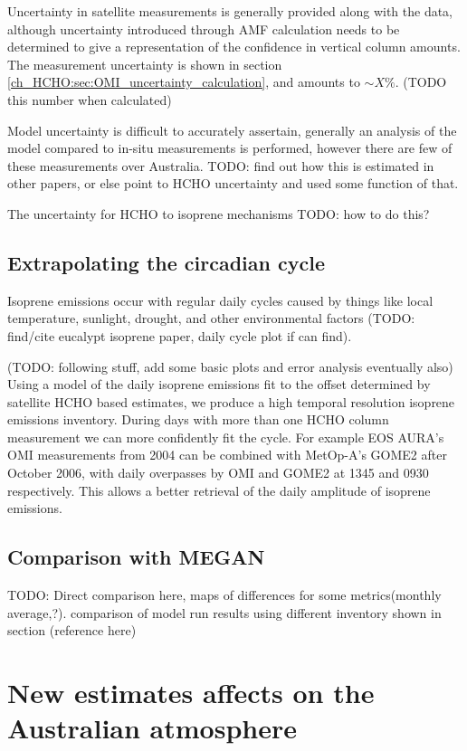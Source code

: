     Uncertainty in satellite measurements is generally provided along with the data, although uncertainty introduced through AMF calculation needs to be determined to give a representation of the confidence in vertical column amounts.
    The measurement uncertainty is shown in section \ref{ch_HCHO:sec:OMI_uncertainty_calculation}, and amounts to $\sim X\%$. (TODO this number when calculated)
    
    Model uncertainty is difficult to accurately assertain, generally an analysis of the model compared to in-situ measurements is performed, however there are few of these measurements over Australia.
    TODO: find out how this is estimated in other papers, or else point to HCHO uncertainty and used some function of that.
    
    The uncertainty for HCHO to isoprene mechanisms TODO: how to do this?
  
  \subsection{Extrapolating the circadian cycle}
    Isoprene emissions occur with regular daily cycles caused by things like local temperature, sunlight, drought, and other environmental factors (TODO: find/cite eucalypt isoprene paper, daily cycle plot if can find).
    
    (TODO: following stuff, add some basic plots and error analysis eventually also)
    Using a model of the daily isoprene emissions fit to the offset determined by satellite HCHO based estimates, we produce a high temporal resolution isoprene emissions inventory.
    During days with more than one HCHO column measurement we can more confidently fit the cycle. 
    For example EOS AURA's OMI measurements from 2004 can be combined with MetOp-A's GOME2 after October 2006, with daily overpasses by OMI and GOME2 at 1345 and 0930 respectively.
    This allows a better retrieval of the daily amplitude of isoprene emissions.
    
  \subsection{Comparison with MEGAN}
    TODO: Direct comparison here, maps of differences for some metrics(monthly average,?). comparison of model run results using different inventory shown in section (reference here)

\section{New estimates affects on the Australian atmosphere}

